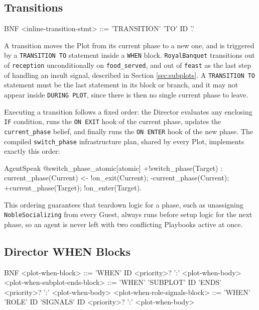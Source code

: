 \subsection{Transitions}
\label{sec:transitions}
\begin{codeblock}[]{BNF}
    <inline-transition-stmt> ::= 'TRANSITION' 'TO' ID '.'
\end{codeblock}

A transition moves the Plot from its current phase to a new one, and is triggered by a \lstinline|TRANSITION TO| statement inside a \lstinline|WHEN| block. \lstinline|RoyalBanquet| transitions out of \lstinline|reception| unconditionally on \lstinline|food_served|, and out of \lstinline|feast| as the last step of handling an insult signal, described in Section \ref{sec:subplots}. A \lstinline|TRANSITION TO| statement must be the last statement in its block or branch, and it may not appear inside \lstinline|DURING PLOT|, since there is then no single current phase to leave.

Executing a transition follows a fixed order: the Director evaluates any enclosing \lstinline|IF| condition, runs the \lstinline|ON EXIT| hook of the current phase, updates the \lstinline|current_phase| belief, and finally runs the \lstinline|ON ENTER| hook of the new phase. The compiled \lstinline|switch_phase| infrastructure plan, shared by every Plot, implements exactly this order:

\begin{codeblock}[]{AgentSpeak}
@switch_phase_atomic[atomic]
+!switch_phase(Target) : current_phase(Current) <-
    !on_exit(Current);
    -current_phase(Current);
    +current_phase(Target);
    !on_enter(Target).
\end{codeblock}

This ordering guarantees that teardown logic for a phase, such as unassigning \lstinline|NobleSocializing| from every Guest, always runs before setup logic for the next phase, so an agent is never left with two conflicting Playbooks active at once.

\subsection{Director WHEN Blocks}
\label{sec:director-when}
\begin{codeblock}[]{BNF}
    <plot-when-block>                 ::= 'WHEN' ID <priority>? ':' <plot-when-body>
    <plot-when-subplot-ends-block>     ::= 'WHEN' 'SUBPLOT' ID 'ENDS' <priority>? ':' <plot-when-body>
    <plot-when-role-signals-block>     ::= 'WHEN' 'ROLE' ID 'SIGNALS' ID <priority>? ':' <plot-when-body>
\end{codeblock}

